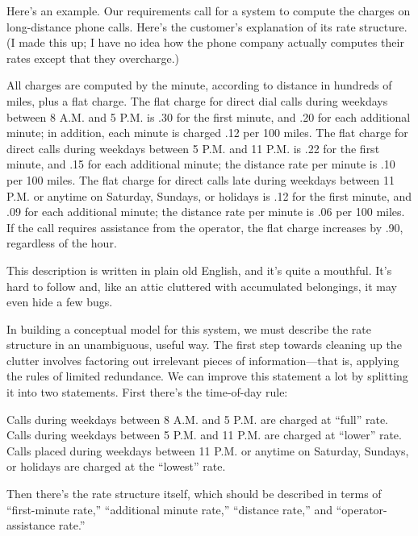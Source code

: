 Here's an example. Our requirements call for a system to compute
the charges on long-distance phone calls. Here's the customer's
explanation of its rate structure. (I made this up; I have no idea how the phone
company actually computes their rates except that they overcharge.)

\begin{tfquot}
\noindent All charges are computed by the minute, according to distance in hundreds
of miles, plus a flat charge. The flat charge for direct dial calls during
weekdays between 8 A.M. and 5 P.M. is .30 for the first minute, and .20 for
each additional minute; in addition, each minute is charged .12 per 100
miles. The flat charge for direct calls during weekdays between 5 P.M. and
11 P.M. is .22 for the first minute, and .15 for each additional minute; the
distance rate per minute is .10 per 100 miles. The flat charge for direct calls
late during weekdays between 11 P.M. or anytime on Saturday, Sundays, or
holidays is .12 for the first minute, and .09 for each additional minute; the
distance rate per minute is .06 per 100 miles. If the call requires assistance
from the operator, the flat charge increases by .90, regardless of the hour.
\end{tfquot}

\noindent This description is written in plain old English, and it's quite a mouthful.
It's hard to follow and, like an attic cluttered with accumulated
belongings, it may even hide a few bugs.


In building a conceptual model for this system, we must describe
the rate structure in an unambiguous, useful way. The first step towards
cleaning up the clutter involves factoring out irrelevant pieces of
information---that is, applying the rules of limited redundance. We can
improve this statement a lot by splitting it into two statements. First
there's the time-of-day rule:

\begin{tfquot}
\noindent Calls during weekdays between 8 A.M. and 5 P.M. are charged at ``full'' rate.
Calls during weekdays between 5 P.M. and 11 P.M. are charged at ``lower''
rate. Calls placed during weekdays between 11 P.M. or anytime on Saturday,
Sundays, or holidays are charged at the ``lowest'' rate.
\end{tfquot}

\noindent Then there's the rate structure itself, which should be described in terms
of ``first-minute rate,'' ``additional minute rate,'' ``distance rate,'' and
``operator-assistance rate.''

